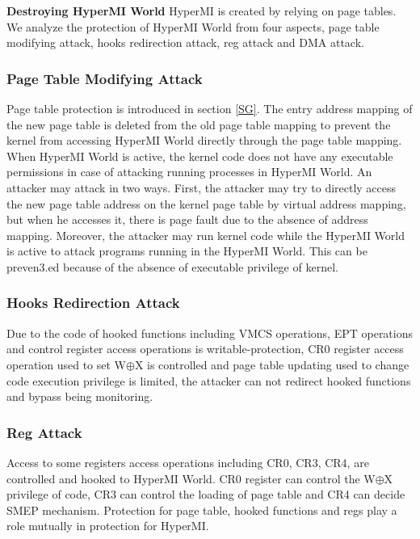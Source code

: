 \documentclass[conference]{IEEEtran}
\begin{document}
\textbf{Destroying HyperMI World}
HyperMI is created by relying on page tables.
We analyze the protection of HyperMI World from four aspects, page table modifying attack, hooks redirection attack, reg attack and DMA attack.

\subsubsection{Page Table Modifying Attack}

Page table protection is introduced in section \ref{SG}. The entry address mapping of the new page table is deleted from the old page table mapping to prevent the kernel from accessing HyperMI World directly through the page table mapping. When HyperMI World is active, the kernel code does not have any executable permissions in case of attacking running processes in HyperMI World. An attacker may attack in two ways.
First, the attacker may try to directly access the new page table address on the kernel page table by virtual address mapping, but when he accesses it, there is page fault due to the absence of address mapping.
Moreover, the attacker may run kernel code while the HyperMI World is active to attack programs running in the HyperMI World. This can be preven3.ed because of the absence of executable privilege of kernel.



\subsubsection{Hooks Redirection Attack}

Due to the code of hooked functions including VMCS operations, EPT operations and  control register access operations is writable-protection, CR0 register access operation used to set W$\oplus${X} is controlled and page table updating used to change code execution privilege is limited, the attacker can not redirect hooked functions and bypass being monitoring.

\subsubsection{Reg Attack}

Access to some registers access operations including CR0, CR3, CR4, are controlled and hooked to HyperMI World. CR0 register can control the W$\oplus${X} privilege of code, CR3 can control the loading of page table and CR4 can decide SMEP mechanism. Protection for page table, hooked functions and regs play a role mutually in protection for HyperMI. 
\end{document}
